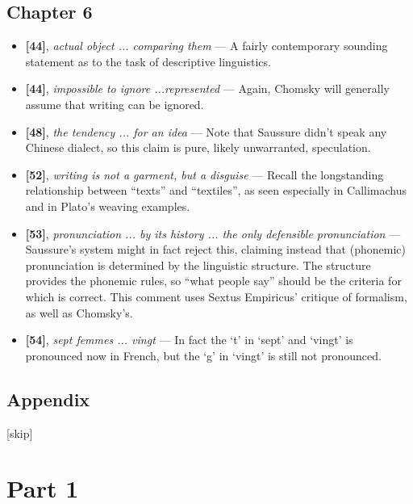 \documentclass[12pt]{article}
\begin{document}
\subsection{Chapter 6}

\begin{itemize}

\item \textbf{[44]}, \textit{actual object ... comparing them} --- A fairly contemporary sounding statement as to the task of descriptive linguistics.

\item \textbf{[44]}, \textit{impossible to ignore ...represented} --- Again, Chomsky will generally assume that writing can be ignored.

\item \textbf{[48]}, \textit{the tendency ... for an idea} --- Note that Saussure didn't speak any Chinese dialect, so this claim is pure, likely unwarranted, speculation.

\item \textbf{[52]}, \textit{writing is not a garment, but a disguise} --- Recall the longstanding relationship between ``texts'' and ``textiles'', as seen especially in Callimachus and in Plato's weaving examples.

\item \textbf{[53]}, \textit{pronunciation ... by its history ... the only defensible pronunciation} --- Saussure's system might in fact reject this, claiming instead that (phonemic) pronunciation is determined by the linguistic structure. The structure provides the phonemic rules, so ``what people say'' should be the criteria for which is correct. This comment uses Sextus Empiricus' critique of formalism, as well as Chomsky's.

\item \textbf{[54]}, \textit{sept femmes ... vingt} --- In fact the `t' in `sept' and `vingt' is pronounced now in French, but the `g' in `vingt' is still not pronounced.

\end{itemize}

\subsection{Appendix}

[skip]

\section{Part 1}
\end{document}
